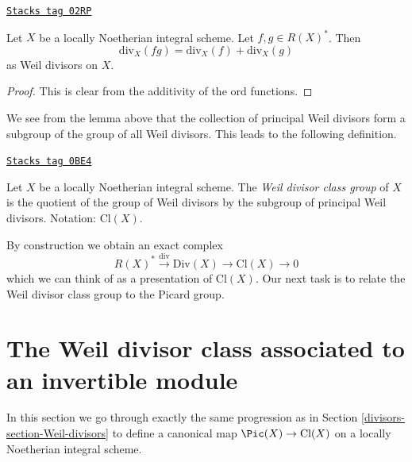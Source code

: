 \begin{lemma}
\label{divisors-lemma-div-additive}
\href{https://stacks.math.columbia.edu/tag/02RP}{\texttt{Stacks tag 02RP}}

Let $X$ be a locally Noetherian integral scheme. Let $f, g \in R(X)^*$. Then
$$
\text{div}_X(fg) = \text{div}_X(f) + \text{div}_X(g)
$$
as Weil divisors on $X$.
\end{lemma}

\begin{proof}
This is clear from the additivity of the $\text{ord}$ functions.
\end{proof}

We see from the lemma above that the collection of principal Weil divisors
form a subgroup of the group of all Weil divisors. This leads to the following
definition.

\begin{definition}
\label{divisors-definition-class-group}
\href{https://stacks.math.columbia.edu/tag/0BE4}{\texttt{Stacks tag 0BE4}}

Let $X$ be a locally Noetherian integral scheme. The
{\it Weil divisor class group} of $X$ is the quotient of
the group of Weil divisors by the subgroup of principal Weil divisors.
Notation: $\text{Cl}(X)$.
\end{definition}

By construction we obtain an exact complex
\begin{equation}
\label{equation-Weil-divisor-class}
R(X)^* \xrightarrow{\text{div}} \text{Div}(X) \to \text{Cl}(X) \to 0
\end{equation}
which we can think of as a presentation of $\text{Cl}(X)$. Our next task
is to relate the Weil divisor class group to the Picard group.

\section{The Weil divisor class associated to an invertible module}
\label{divisors-section-c1}
In this section we go through exactly the same progression as in
Section \ref{divisors-section-Weil-divisors} to define a canonical map
$\Pic(X) \to \text{Cl}(X)$
on a locally Noetherian integral scheme.


